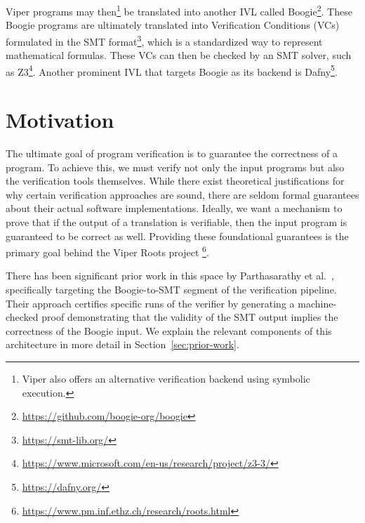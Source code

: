 Viper programs may then\footnote{Viper also offers an alternative verification backend using symbolic execution.} be translated into another IVL called Boogie\footnote{\url{https://github.com/boogie-org/boogie}}.
These Boogie programs are ultimately translated into Verification Conditions (VCs)
formulated in the SMT format\footnote{\url{https://smt-lib.org/}}, which is a standardized way to represent mathematical formulas.
These VCs can then be checked by an SMT solver, such as Z3\footnote{\url{https://www.microsoft.com/en-us/research/project/z3-3/}}.
Another prominent IVL that targets Boogie as its backend is Dafny\footnote{\url{https://dafny.org/}}.




\section{Motivation}
\label{sec:motivation}

The ultimate goal of program verification is to guarantee the correctness of a program.
To achieve this, we must verify not only the input programs but also the verification tools themselves.
While there exist theoretical justifications for why certain verification approaches are sound,
there are seldom formal guarantees about their actual software implementations.
Ideally, we want a mechanism to prove that if the output of a translation is verifiable,
then the input program is guaranteed to be correct as well.
Providing these foundational guarantees is the primary goal behind the Viper Roots project
\footnote{\url{https://www.pm.inf.ethz.ch/research/roots.html}}.

There has been significant prior work in this space by Parthasarathy et al.~\cite{parthasarathy2021formally}, 
specifically targeting the Boogie-to-SMT segment of the verification pipeline.
Their approach certifies specific runs of the verifier by generating a machine-checked proof demonstrating that the validity of the SMT output implies the correctness of the Boogie input.
We explain the relevant components of this architecture in more detail in Section~\ref{sec:prior-work}.

